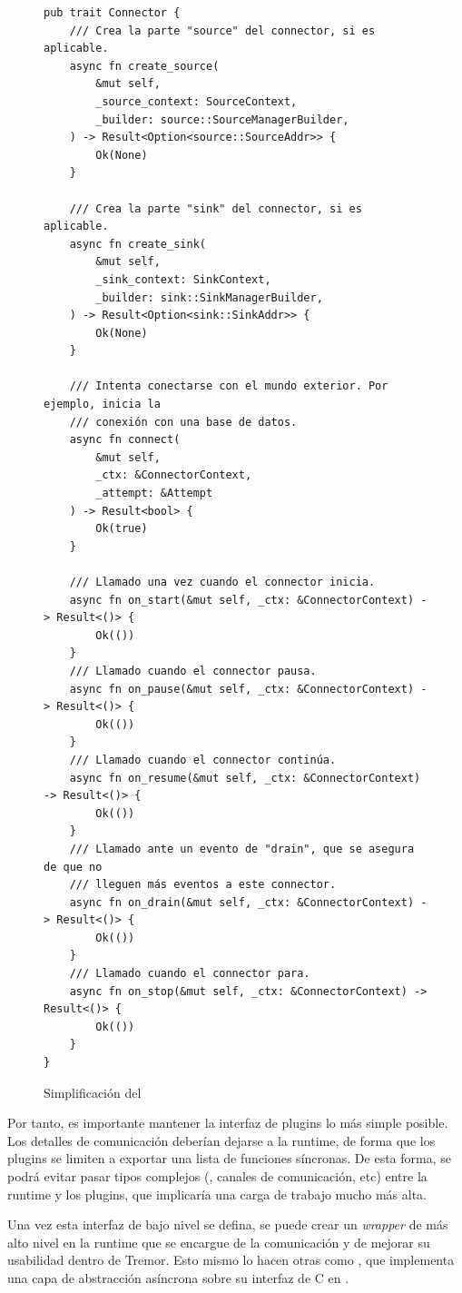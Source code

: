 \begin{figure}[h]
    \centering
    \begin{verbatim}
pub trait Connector {
    /// Crea la parte "source" del connector, si es aplicable.
    async fn create_source(
        &mut self,
        _source_context: SourceContext,
        _builder: source::SourceManagerBuilder,
    ) -> Result<Option<source::SourceAddr>> {
        Ok(None)
    }

    /// Crea la parte "sink" del connector, si es aplicable.
    async fn create_sink(
        &mut self,
        _sink_context: SinkContext,
        _builder: sink::SinkManagerBuilder,
    ) -> Result<Option<sink::SinkAddr>> {
        Ok(None)
    }

    /// Intenta conectarse con el mundo exterior. Por ejemplo, inicia la
    /// conexión con una base de datos.
    async fn connect(
        &mut self,
        _ctx: &ConnectorContext,
        _attempt: &Attempt
    ) -> Result<bool> {
        Ok(true)
    }

    /// Llamado una vez cuando el connector inicia.
    async fn on_start(&mut self, _ctx: &ConnectorContext) -> Result<()> {
        Ok(())
    }
    /// Llamado cuando el connector pausa.
    async fn on_pause(&mut self, _ctx: &ConnectorContext) -> Result<()> {
        Ok(())
    }
    /// Llamado cuando el connector continúa.
    async fn on_resume(&mut self, _ctx: &ConnectorContext) -> Result<()> {
        Ok(())
    }
    /// Llamado ante un evento de "drain", que se asegura de que no
    /// lleguen más eventos a este connector.
    async fn on_drain(&mut self, _ctx: &ConnectorContext) -> Result<()> {
        Ok(())
    }
    /// Llamado cuando el connector para.
    async fn on_stop(&mut self, _ctx: &ConnectorContext) -> Result<()> {
        Ok(())
    }
}
    \end{verbatim}
    \caption{Simplificación del \trait {}}%
    \label{fig:tremor_connector_trait}
\end{figure}

Por tanto, es importante mantener la interfaz de plugins lo más simple posible.
Los detalles de comunicación deberían dejarse a la runtime, de forma que los
plugins se limiten a exportar una lista de funciones síncronas. De esta forma,
se podrá evitar pasar tipos complejos (, canales de comunicación,
etc) entre la runtime y los plugins, que implicaría una carga de trabajo mucho
más alta.

Una vez esta interfaz de bajo nivel se defina, se puede crear un \emph{wrapper}
de más alto nivel en la runtime que se encargue de la comunicación y de mejorar
su usabilidad dentro de Tremor. Esto mismo lo hacen otras \crates como
, que implementa una capa de abstracción asíncrona sobre su
interfaz de C en .


